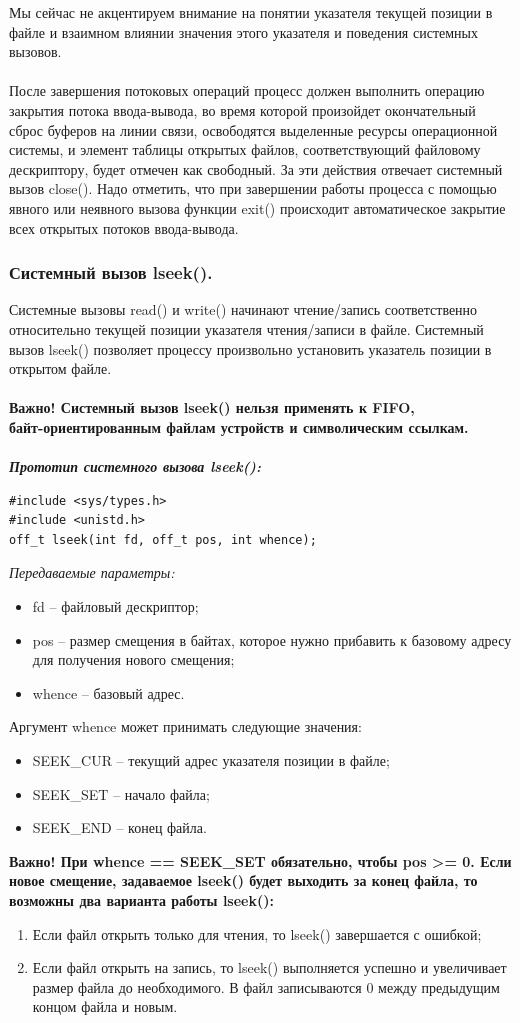 \documentclass[a4paper]{article}
\begin{document}
Мы сейчас не акцентируем внимание на понятии указателя текущей позиции в файле и взаимном влиянии значения этого указателя и поведения системных вызовов. \\\\
После завершения потоковых операций процесс должен выполнить операцию закрытия потока ввода-вывода, во время которой произойдет окончательный сброс буферов на линии связи, освободятся выделенные ресурсы операционной системы, и элемент таблицы открытых файлов, соответствующий файловому дескриптору, будет отмечен как свободный. За эти действия отвечает системный вызов close(). Надо отметить, что при завершении работы процесса с помощью явного или неявного вызова функции exit() происходит автоматическое закрытие всех открытых потоков ввода-вывода.

\subsubsection{\Large Системный вызов lseek().}
Системные вызовы read() и write() начинают чтение/запись соответственно относительно текущей позиции указателя чтения/записи в файле. Системный вызов lseek() позволяет процессу произвольно установить указатель позиции в открытом файле. \\\\
\bf Важно! \rm Системный вызов lseek() нельзя применять к FIFO, \\байт-ориентированным файлам устройств и символическим ссылкам.\\\\
\sl Прототип системного вызова lseek():
\begin{verbatim}
#include <sys/types.h>
#include <unistd.h>
off_t lseek(int fd, off_t pos, int whence);
\end{verbatim}
\sl Передаваемые параметры:
\begin{itemize}
  \item fd – файловый дескриптор;
  \item pos – размер смещения в байтах, которое нужно прибавить к базовому адресу для получения нового смещения;
  \item whence – базовый адрес.
\end{itemize}
\rm Аргумент whence может принимать следующие значения:
\begin{itemize}
  \item SEEK\_CUR – текущий адрес указателя позиции в файле;
  \item SEEK\_SET – начало файла;
  \item SEEK\_END – конец файла.
\end{itemize}
\bf Важно! \rm При whence == SEEK\_SET обязательно, чтобы pos >= 0. Если новое смещение, задаваемое lseek() будет выходить за конец файла, то возможны два варианта работы lseek():
\begin{enumerate}
  \item Если файл открыть только для чтения, то lseek() завершается с ошибкой;
  \item Если файл открыть на запись, то lseek() выполняется успешно и увеличивает размер файла до необходимого. В файл записываются 0 между предыдущим концом файла и новым.
\end{enumerate}
\end{document}
